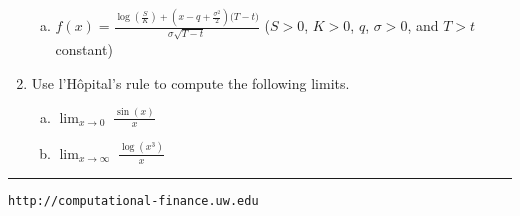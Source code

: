 \documentclass[letterpaper,12pt]{article}
\begin{document}
\begin{enumerate}
\begin{enumerate}[(a)]
\item $\displaystyle f(x) = \frac{\log\left(\frac{S}{K}\right) + \left(x - q + \frac{\sigma^{2}}{2} \right) \big( T - t \big)}{\sigma \sqrt{T - t}}$ ($S > 0$, $K > 0$, $q$, $\sigma > 0$, and $T > t$ constant)

\end{enumerate}

\vspace{1em}


\item Use l'H\^{o}pital's rule to compute the following limits.

\vspace{0.5em}

\begin{enumerate}[(a)]
\item $\displaystyle \lim_{x \rightarrow 0} \; \frac{\sin(x)}{x}$

\vspace{0.5em}

\item $\displaystyle \lim_{x \rightarrow \infty} \; \frac{\log(x^{3})}{x}$
\end{enumerate}

\end{enumerate}


\vfill \hrule \vspace{2mm} \centerline {\tt \tiny http://computational-finance.uw.edu}
\end{document}
